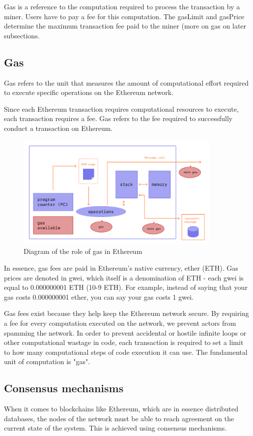 Gas is a reference to the computation required to process the transaction by a miner. Users have to pay a fee for this computation. The gasLimit and gasPrice determine the maximum transaction fee paid to the miner (more on gas on later subsections.

\subsection{Gas}
Gas refers to the unit that measures the amount of computational effort required to execute specific operations on the Ethereum network.

Since each Ethereum transaction requires computational resources to execute, each transaction requires a fee. Gas refers to the fee required to successfully conduct a transaction on Ethereum.

\begin{figure}[h]
	\centering
		\includegraphics[width=10cm]{images/chapter2/gas.png}
		\caption{{\footnotesize Diagram of the role of gas in Ethereum \cite{taniTakenobuhsEthereumevmillustratedOnline2021}}}
\end{figure}

In essence, gas fees are paid in Ethereum's native currency, ether (ETH). Gas prices are denoted in gwei, which itself is a denomination of ETH - each gwei is equal to 0.000000001 ETH (10-9 ETH). For example, instead of saying that your gas costs 0.000000001 ether, you can say your gas costs 1 gwei.

Gas fees exist because they help keep the Ethereum network secure. By requiring a fee for every computation executed on the network, we prevent actors from spamming the network. In order to prevent accidental or hostile infinite loops or other computational wastage in code, each transaction is required to set a limit to how many computational steps of code execution it can use. The fundamental unit of computation is "gas".

\subsection{Consensus mechanisms}
When it comes to blockchains like Ethereum, which are in essence distributed databases, the nodes of the network must be able to reach agreement on the current state of the system. This is achieved using consensus mechanisms.

